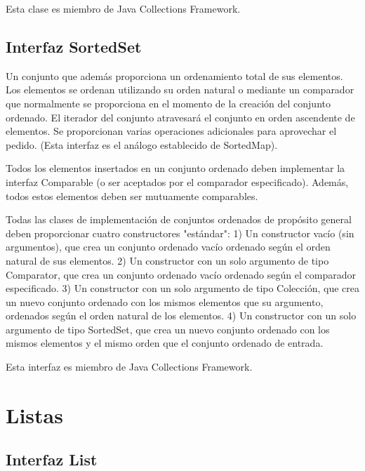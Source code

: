 \documentclass[11pt]{article}
\begin{document}
\par

Esta clase es miembro de Java Collections Framework.

\subsection{Interfaz SortedSet}
\par
Un conjunto que además proporciona un ordenamiento total de sus 
elementos. Los elementos se ordenan utilizando su orden natural o 
mediante un comparador que normalmente se proporciona en el momento 
de la creación del conjunto ordenado. El iterador del conjunto 
atravesará el conjunto en orden ascendente de elementos. Se 
proporcionan varias operaciones adicionales para aprovechar el 
pedido. (Esta interfaz es el análogo establecido de SortedMap).
\par

Todos los elementos insertados en un conjunto ordenado deben 
implementar la interfaz Comparable (o ser aceptados por el comparador 
especificado). Además, todos estos elementos deben ser mutuamente 
comparables.
\par

Todas las clases de implementación de conjuntos ordenados de 
propósito general deben proporcionar cuatro constructores "estándar": 
1) Un constructor vacío (sin argumentos), que crea un conjunto 
ordenado vacío ordenado según el orden natural de sus elementos. 2) 
Un constructor con un solo argumento de tipo Comparator, que crea un 
conjunto ordenado vacío ordenado según el comparador especificado. 3) 
Un constructor con un solo argumento de tipo Colección, que crea un 
nuevo conjunto ordenado con los mismos elementos que su argumento, 
ordenados según el orden natural de los elementos. 4) Un constructor 
con un solo argumento de tipo SortedSet, que crea un nuevo conjunto 
ordenado con los mismos elementos y el mismo orden que el conjunto 
ordenado de entrada.
\par
Esta interfaz es miembro de Java Collections Framework.

\section{Listas}

\subsection{Interfaz List}
\par
\end{document}
